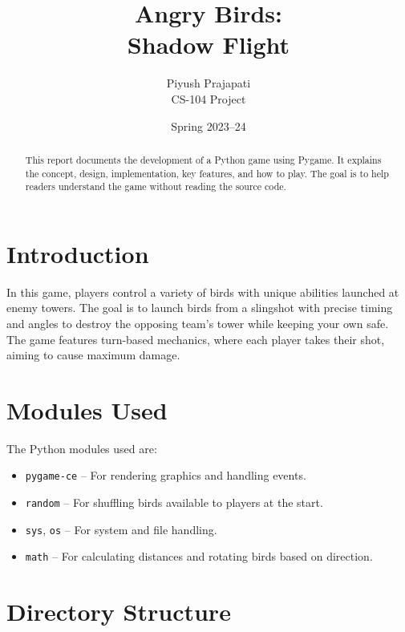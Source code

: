 \documentclass[10pt]{article}
\title{Angry Birds: \\Shadow Flight}
\author{Piyush Prajapati \\ CS-104 Project}
\date{Spring 2023–24}
\begin{document}
\maketitle

\begin{abstract}
    This report documents the development of a Python game using Pygame. It explains the concept, design, implementation, key features, and how to play. The goal is to help readers understand the game without reading the source code.
\end{abstract}

\tableofcontents
\newpage

\section{Introduction}\label{sec:introduction}
In this game, players control a variety of birds with unique abilities launched at enemy towers. The goal is to launch birds from a slingshot with precise timing and angles to destroy the opposing team's tower while keeping your own safe. The game features turn-based mechanics, where each player takes their shot, aiming to cause maximum damage.

\section{Modules Used}\label{sec:modules}
The Python modules used are:
\begin{itemize}
    \item \texttt{pygame-ce} – For rendering graphics and handling events.
    \item \texttt{random} – For shuffling birds available to players at the start.
    \item \texttt{sys}, \texttt{os} – For system and file handling.
    \item \texttt{math} – For calculating distances and rotating birds based on direction.
\end{itemize}

\section{Directory Structure}\label{sec:directory-structure}
\end{document}
